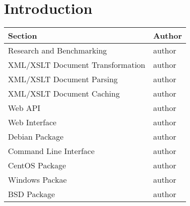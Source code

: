 \section{Introduction}

\begin{center}
    \begin{tabular}{ | l | p{10cm} |}
    \hline
    Section & Author \\ \hline
    Research and Benchmarking & author \\ \hline
    XML/XSLT Document Transformation & author \\ \hline
    XML/XSLT Document Parsing & author \\ \hline
    XML/XSLT Document Caching & author \\ \hline
    Web API & author \\ \hline
    Web Interface & author \\ \hline
    Debian Package & author \\ \hline
    Command Line Interface& author \\ \hline
    CentOS Package & author \\ \hline
    Windows Packae & author \\ \hline
    BSD Package & author \\ \hline
    \end{tabular}
\end{center}
